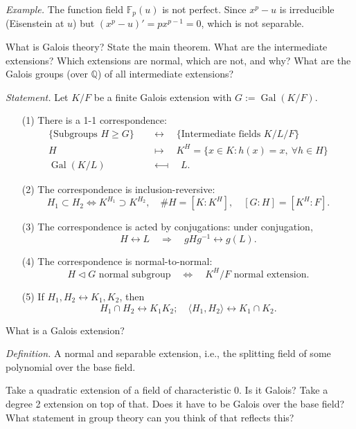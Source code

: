 \documentclass{mathproblems}
\newcommand\Q{\mathbb{Q}}
\newcommand\F{\mathbb{F}}
\DeclareMathOperator{\Gal}{Gal}
\begin{document}
\begin{questions}
\textit{Example.}
The function field $\F_p(u)$ is not perfect. Since $x^p-u$ is irreducible (Eisenstein at $u$) but $(x^p-u)'=p x^{p-1}=0$, which is not separable.

\miquestion
{\color{blue} What is Galois theory? State the main theorem. What are the intermediate extensions? Which extensions are normal, which are not, and why? What are the Galois groups (over $\Q$) of all intermediate extensions?}

{\color{violet}
\textit{Statement.} Let $K/F$ be a finite Galois extension with $G:=\Gal(K/F)$.
\begin{itemize}
\item[(1)] There is a 1-1 correspondence:
$$
\begin{aligned}
\{\text{Subgroups } H\geq G\} & \quad \longleftrightarrow \quad \{\text{Intermediate fields } K/L/F\} \\
H & \quad\longmapsto\quad K^H=\{x\in K: h(x)=x, \ \forall h\in H\}\\
\Gal(K/L) & \quad\longmapsfrom\quad L.
\end{aligned}
$$
\item[(2)] The correspondence is inclusion-reversive: $$
H_1\subset H_2 \Longleftrightarrow K^{H_1}\supset K^{H_2},\quad \# H=[K:K^H], \quad [G:H]=[K^H:F].
$$
\item[(3)] The correspondence is acted by conjugations: under conjugation,
$$
H \longleftrightarrow L \quad \Longrightarrow \quad g H g^{-1}\longleftrightarrow g(L).
$$
\item[(4)] The correspondence is normal-to-normal:
$$
H \triangleleft G \text{ normal subgroup} \quad \Longleftrightarrow \quad K^H/F \text{ normal extension}.
$$
\item[(5)] If $H_1,H_2\leftrightarrow K_1,K_2$, then
$$
H_1\cap H_2 \longleftrightarrow K_1K_2; \quad \langle H_1, H_2 \rangle \longleftrightarrow K_1\cap K_2.
$$

\end{itemize}
}

\miquestion
{\color{blue} What is a Galois extension?}

\textit{Definition.} A normal and separable extension, i.e., the splitting field of some polynomial over the base field.

\miquestion
{\color{blue} Take a quadratic extension of a field of characteristic 0. Is it Galois? Take a degree 2 extension on top of that. Does it have to be Galois over the base field? What statement in group theory can you think of that reflects this?}


\end{questions}
\end{document}
